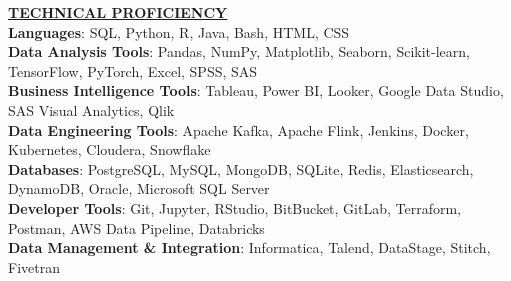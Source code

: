 \documentclass{article}
\begin{document}
\noindent \textbf{\underline{TECHNICAL PROFICIENCY}} \\
\textbf{Languages}{: \small SQL, Python, R, Java, Bash, HTML, CSS} \\
\textbf{Data Analysis Tools}{: \small Pandas, NumPy, Matplotlib, Seaborn, Scikit-learn, TensorFlow, PyTorch, Excel, SPSS, SAS} \\
\textbf{Business Intelligence Tools}{: \small Tableau, Power BI, Looker, Google Data Studio, SAS Visual Analytics, Qlik} \\
\textbf{Data Engineering Tools}{: \small Apache Kafka, Apache Flink, Jenkins, Docker, Kubernetes, Cloudera, Snowflake} \\
\textbf{Databases}{: \small PostgreSQL, MySQL, MongoDB, SQLite, Redis, Elasticsearch, DynamoDB, Oracle, Microsoft SQL Server} \\
\textbf{Developer Tools}{: \small Git, Jupyter, RStudio, BitBucket, GitLab, Terraform, Postman, AWS Data Pipeline, Databricks} \\
\textbf{Data Management \& Integration}{: \small Informatica, Talend, DataStage, Stitch, Fivetran}

\vspace{2mm} 

\end{document}
